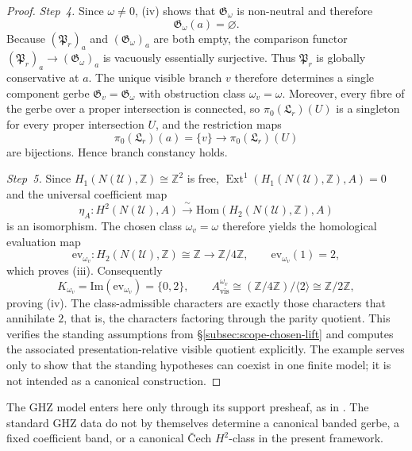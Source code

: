 \begin{proof}
\emph{Step~4.}
Since $\omega\neq 0$, (iv) shows that $\mathfrak G_{\omega}$ is non-neutral and therefore
\[
\mathfrak G_{\omega}(a)=\varnothing.
\]
Because $(\mathfrak P_r)_a$ and $(\mathfrak G_{\omega})_a$ are both empty, the comparison functor $(\mathfrak P_r)_a\to (\mathfrak G_{\omega})_a$ is vacuously essentially surjective. Thus $\mathfrak P_r$ is globally conservative at $a$. The unique visible branch $v$ therefore determines a single component gerbe $\mathfrak G_v=\mathfrak G_{\omega}$ with obstruction class $\omega_v=\omega$. Moreover, every fibre of the gerbe over a proper intersection is connected, so $\pi_0(\mathfrak L_r)(U)$ is a singleton for every proper intersection $U$, and the restriction maps
\[
\pi_0(\mathfrak L_r)(a)=\{v\}\longrightarrow \pi_0(\mathfrak L_r)(U)
\]
are bijections. Hence branch constancy holds.

\emph{Step~5.}
Since $H_1(N(\mathcal U),\mathbb Z)\cong \mathbb Z^2$ is free, $\operatorname{Ext}^1(H_1(N(\mathcal U),\mathbb Z),A)=0$ and the universal coefficient map
\[
\eta_A:H^2(N(\mathcal U),A)\xrightarrow{\;\sim\;} \mathrm{Hom}(H_2(N(\mathcal U),\mathbb Z),A)
\]
is an isomorphism. The chosen class $\omega_v=\omega$ therefore yields the homological evaluation map
\[
\mathrm{ev}_{\omega_v}:H_2(N(\mathcal U),\mathbb Z)\cong\mathbb Z\longrightarrow \mathbb Z/4\mathbb Z,
\qquad
\mathrm{ev}_{\omega_v}(1)=2,
\]
which proves \textup{(iii)}. Consequently
\[
K_{\omega_v}=\mathrm{Im}(\mathrm{ev}_{\omega_v})=\{0,2\},
\qquad
A_{\mathrm{vis}}^{\omega_v}\cong (\mathbb Z/4\mathbb Z)/\langle 2\rangle\cong\mathbb Z/2\mathbb Z,
\]
proving \textup{(iv)}. The class-admissible characters are exactly those characters that annihilate $2$, that is, the characters factoring through the parity quotient. This verifies the standing assumptions from \S\ref{subsec:scope-chosen-lift} and computes the associated presentation-relative visible quotient explicitly. The example serves only to show that the standing hypotheses can coexist in one finite model; it is not intended as a canonical construction.
\end{proof}

\begin{remark}\label{rem:ghz-benchmark}
The GHZ model enters here only through its support presheaf, as in \cite{AbramskyBrandenburger2011}. The standard GHZ data do not by themselves determine a canonical banded gerbe, a fixed coefficient band, or a canonical \v{C}ech $H^2$-class in the present framework.
\end{remark}


